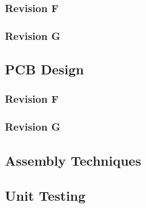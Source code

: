 \subsubsection{Revision F} \label{sssec:rev_f_sch}

\subsubsection{Revision G} \label{sssec:rev_g_sch}

\subsection{PCB Design} \label{sec:pcb}

\subsubsection{Revision F} \label{sssec:rev_f_pcb}

\subsubsection{Revision G} \label{sssec:rev_g_pcb}

\subsection{Assembly Techniques} \label{ssec:assembly_techniques}

\subsection{Unit Testing} \label{ssec:unit_testing}